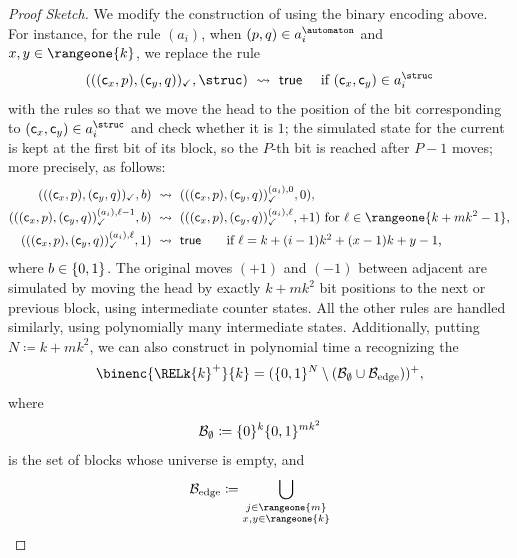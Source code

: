 \documentclass[10pt,a4paper]{article}
\theoremstyle{definition}
\theoremstyle{remark}
\DeclarePairedDelimiter\set{\{}{\}}
\DeclarePairedDelimiter\tuple{(}{)}
\newcommand{\const}[1]{\mathsf{#1}}
\newcommand{\defeq}{\coloneq}
\begin{document}
\begin{proof}[Proof Sketch]
    We modify the construction of 
    using the binary encoding above.
    For instance, for the rule $(a_i)$,
    when $\tuple{p, q} \in a_i^{\automaton}$ and $x,y\in\rangeone{k}$,
    we replace the rule
    \[\tuple{\tuple{\tuple{\const{c}_x, p}, \tuple{\const{c}_y, q}}_{\checkmark}, \struc} ~\leadsto~ \const{true} \quad\text{ if $\tuple{\const{c}_x, \const{c}_y} \in a_i^{\struc}$}\]
    with the rules so that
    we move the head to the position of the bit corresponding to $\tuple{\const{c}_x, \const{c}_y} \in a_i^{\struc}$ and check whether it is $1$;
    the simulated state for the current  is kept at the first bit of its block, so the $P$-th bit is reached after $P-1$ moves;
    more precisely, as follows:
    \begin{align*}
        \tuple{\tuple{\tuple{\const{c}_x, p}, \tuple{\const{c}_y, q}}_{\checkmark}, b} &~\leadsto~ \tuple{\tuple{\tuple{\const{c}_x, p}, \tuple{\const{c}_y, q}}_{\checkmark}^{(a_i), 0}, 0},\\
        \tuple{\tuple{\tuple{\const{c}_x, p}, \tuple{\const{c}_y, q}}_{\checkmark}^{(a_i), \ell-1}, b} &~\leadsto~ \tuple{\tuple{\tuple{\const{c}_x, p}, \tuple{\const{c}_y, q}}_{\checkmark}^{(a_i), \ell}, +1} \text{ for $\ell \in \rangeone{k + m k^2 - 1}$,}\\
        \tuple{\tuple{\tuple{\const{c}_x, p}, \tuple{\const{c}_y, q}}_{\checkmark}^{(a_i), \ell}, 1} &~\leadsto~ \const{true} \tag*{if $\ell = k + (i-1)k^2 + (x-1)k + y - 1$,}
    \end{align*}
    where $b \in \set{0, 1}$.
    The original moves $(+1)$ and $(-1)$ between adjacent  are simulated by moving the head by exactly $k + m k^2$ bit positions to the next or previous block, using intermediate counter states.
    All the other rules are handled similarly, using polynomially many intermediate states.
    Additionally, putting $N \defeq k + m k^2$,
    we can also construct in polynomial time a  recognizing the 
    \[
        \binenc{\RELk{k}^{+}}{k} = (\set{0,1}^{N} \setminus (\mathcal{B}_{\emptyset} \cup \mathcal{B}_{\mathrm{edge}}))^{+},
    \]
    where
    \[
        \mathcal{B}_{\emptyset} \defeq \set{0}^{k}\set{0,1}^{mk^2}
    \]
    is the set of blocks whose universe is empty, and
    \begin{align*}
        \mathcal{B}_{\mathrm{edge}}
        \defeq
        \bigcup_{\substack{j \in \rangeone{m}\\ x,y \in \rangeone{k}}}

\end{align*}
\end{proof}
\end{document}
